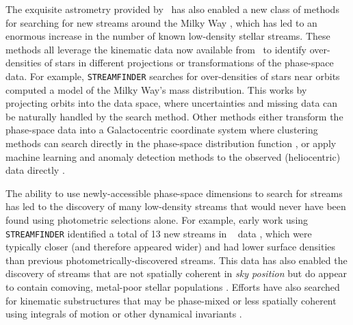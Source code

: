 \documentclass[final,5p,times,twocolumn,authoryear]{elsarticle}
\begin{document}
The exquisite astrometry provided by \gaia\ has also enabled a new class of methods for
searching for new streams around the Milky Way \citep[e.g.,][]{malhan:2018a,
borsato:2020, necib:2020, gatto:2020, shih:2022, shih:2023, pettee:2024}, which has led
to an enormous increase in the number of known low-density stellar streams.
These methods all leverage the kinematic data now available from \gaia\ to identify
over-densities of stars in different projections or transformations of the phase-space
data.
For example, \texttt{STREAMFINDER} \citep{malhan:2018a} searches for over-densities of
stars near orbits computed a model of the Milky Way's mass distribution.
This works by projecting orbits into the data space, where uncertainties and missing
data can be naturally handled by the search method.
Other methods either transform the phase-space data into a Galactocentric coordinate
system where clustering methods can search directly in the phase-space distribution
function \citep{necib:2020,gatto:2020}, or apply machine learning and anomaly detection
methods to the observed (heliocentric) data directly \citep{borsato:2020, shih:2022,
shih:2023, pettee:2024}.

The ability to use newly-accessible phase-space dimensions to search for streams has led
to the discovery of many low-density streams that would never have been found using
photometric selections alone.
For example, early work using \texttt{STREAMFINDER} identified a total of 13 new streams
in \gaia\  data \citep{malhan:2018, ibata:2018, ibata:2019}, which were typically
closer (and therefore appeared wider) and had lower surface densities than previous
photometrically-discovered streams.
This data has also enabled the discovery of streams that are not spatially coherent in
\emph{sky position} but do appear to contain comoving, metal-poor stellar populations
\citep[e.g.,]{necib:2020b, balbinot:2023}.
Efforts have also searched for kinematic substructures that may be phase-mixed or less
spatially coherent using integrals of motion or other dynamical invariants
\citep[e.g.,][]{koppelman:2019b, yuan:2020, naidu:2020, ou:2023}.
\end{document}
